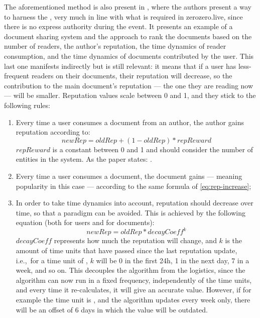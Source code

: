 The aforementioned method is also present in \cite{Daly2009}, where the authors present a way to harness the , very much in line with what is required in zerozero.live, since there is no express authority during the event. It presents an example of a document sharing system and the approach to rank the documents based on the number of readers, the author's reputation, the time dynamics of reader consumption, and the time dynamics of documents contributed by the user. This last one manifests indirectly but is still relevant: it means that if a user has less-frequent readers on their documents, their reputation will decrease, so the contribution to the main document's reputation --- the one they are reading now --- will be smaller.
Reputation values scale between 0 and 1, and they stick to the following rules:
\begin{enumerate}
    \item Every time a user consumes a document from an author, the author gains reputation according to:
    \begin{equation} \label{eq:rep-increase}
        newRep = oldRep + (1 - oldRep) * repReward  
    \end{equation}
    $repReward$ is a constant between 0 and 1 and should consider the number of entities in the system. As the paper states: .
    \item Every time a user consumes a document, the document gains  --- meaning popularity in this case --- according to the same formula of \ref{eq:rep-increase};
    \item In order to take time dynamics into account, reputation should decrease over time, so that a  paradigm can be avoided. This is achieved by the following equation (both for users and for documents):
    \begin{equation}
        newRep = oldRep * decayCoeff^k
    \end{equation}
    $decayCoeff$ represents how much the reputation will change, and $k$ is the amount of time units that have passed since the last reputation update, i.e.,\ for a time unit of , $k$ will be 0 in the first 24h, 1 in the next day, 7 in a week, and so on. This decouples the algorithm from the logistics, since the algorithm can now run in a fixed frequency, independently of the time units, and every time it re-calculates, it will give an accurate value. However, if for example the time unit is , and the algorithm updates every week only, there will be an offset of 6 days in which the value will be outdated.

\end{enumerate}
